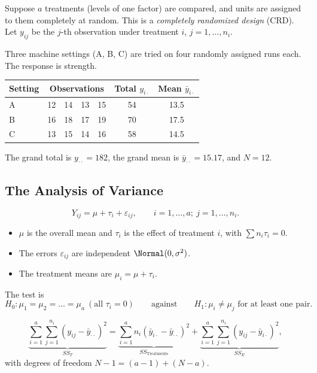 Suppose $a$ treatments (levels of one factor) are compared, and units are assigned to them completely at random. This is a \emph{completely randomized design} (CRD). Let $y_{ij}$ be the $j$-th observation under treatment $i$, $j=1,\dots,n_i$.

\begin{example}\label{ex:anovadata}
Three machine settings (A, B, C) are tried on four randomly assigned runs each. The response is strength.
\begin{center}
\begin{tabular}{lcccc|cc}
\toprule
Setting & \multicolumn{4}{c|}{Observations} & Total $y_{i\cdot}$ & Mean $\bar{y}_{i\cdot}$\\
\midrule
A & 12 & 14 & 13 & 15 & 54 & 13.5\\
B & 16 & 18 & 17 & 19 & 70 & 17.5\\
C & 13 & 15 & 14 & 16 & 58 & 14.5\\
\bottomrule
\end{tabular}
\end{center}
The grand total is $y_{\cdot\cdot}=182$, the grand mean is $\bar{y}_{\cdot\cdot}=15.17$, and $N=12$.
\end{example}

\subsection{The Analysis of Variance}

\begin{definition}
\[ Y_{ij}=\mu+\tau_i+\varepsilon_{ij},\qquad i=1,\dots,a;\ j=1,\dots,n_i. \]
\begin{itemize}
  \item $\mu$ is the overall mean and $\tau_i$ is the effect of treatment $i$, with $\sum n_i\tau_i=0$.
  \item The errors $\varepsilon_{ij}$ are independent $\Normal(0,\sigma^2)$.
  \item The treatment means are $\mu_i=\mu+\tau_i$.
\end{itemize}
\end{definition}

The test is
\[ H_0:\mu_1=\mu_2=\dots=\mu_a\ (\text{all }\tau_i=0)\qquad\text{against}\qquad H_1:\mu_i\ne\mu_j\text{ for at least one pair.} \]

\begin{theorem}\label{thm:anova-ss}
\[ \underbrace{\sum_{i=1}^a\sum_{j=1}^{n_i}(y_{ij}-\bar{y}_{\cdot\cdot})^2}_{SS_T}=\underbrace{\sum_{i=1}^an_i(\bar{y}_{i\cdot}-\bar{y}_{\cdot\cdot})^2}_{SS_{\mathrm{Treatments}}}+\underbrace{\sum_{i=1}^a\sum_{j=1}^{n_i}(y_{ij}-\bar{y}_{i\cdot})^2}_{SS_E}, \]
with degrees of freedom $N-1=(a-1)+(N-a)$.
\end{theorem}

